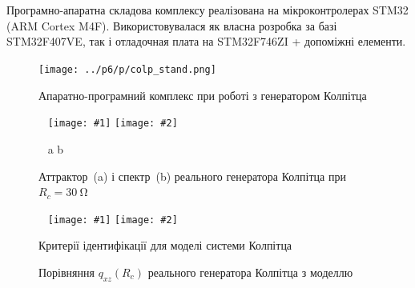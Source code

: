 \documentclass[14pt,handout,utf8]{beamer}
\newlength\DDP
\newcommand{\ABlbl}{%
  \vspace{-2.9ex}
  \begin{center}
    ~ \hfill a \hfill\hfill b \hfill ~
  \end{center}
  \vspace{-2.0ex}
}
\newcommand{\PicDoubleS}[2]{%
 \begin{center}
    ~ \hfill
    \texttt{[image: \#1]}
    \hfill
    \texttt{[image: \#2]}
    \hfill ~
  \end{center}
  \ABlbl
}
\newcommand{\PicDoubleNL}[2]{%
 \begin{center}
    ~ \hfill
    \texttt{[image: \#1]}
    \hfill
    \texttt{[image: \#2]}
    \hfill ~
  \end{center}
}
\begin{document}

\begin{frame}
  \frametitle{~}

  Програмно-апаратна складова комплексу реалізована на
  мікроконтролерах STM32 (ARM Cortex M4F). Використовувалася як власна
  розробка за базі STM32F407VE, так і отладочная плата на STM32F746ZI +
  допоміжні елементи.

  \begin{figure}[ht!]
    \centerline{\texttt{[image: ../p6/p/colp\_stand.png]} }
    \caption{Апаратно-програмний комплекс при роботі з генератором Колпітца}
    \label{atu:colp_stand}
  \end{figure}

  \vspace{-5ex}

  \begin{figure}[htb!]
    \PicDoubleS{../p6/p/r/v1iv2_030000.png}{../p6/p/r/f_030000.png}
    \caption{Аттрактор~(a) і спектр~(b) реального генератора Колпітца при $R_c = \SI{30}{\ohm} $}
    \label{atu:f:colp_r_attr_f_30}
  \end{figure}

  \vspace{-3ex}

  \begin{figure}[htb!]
    \PicDoubleNL{../p6/p/colp_bjt_q-p_Rc_q.png}{../p6/p/colp_q_cml.png}
    \vspace{-3ex}
    \parbox[t]{\DDP} {
      \caption{Критерії ідентифікації для моделі системи Колпітца}
      \label{atu:f:colp_bjt_q-p_Rc_q}
    }
    \hfill
    \parbox[t]{\DDP} {
      \caption{Порівняння $q_{xz}(R_c)$ реального генератора Колпітца з моделлю}
      \label{atu:f:colp_q_cml}
    }
  \end{figure}


\end{frame}


\end{document}
